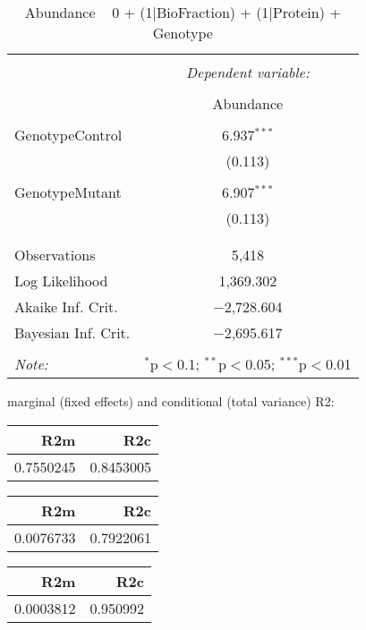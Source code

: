 \documentclass[11pt]{report}
\begin{document}
\begin{table}[!htbp] \centering 
  \caption{Abundance ~ 0 + (1|BioFraction) + (1|Protein) + Genotype} 
  \label{} 
\begin{tabular}{@{\extracolsep{5pt}}lc} 
\\[-1.8ex]\hline 
\hline \\[-1.8ex] 
 & \multicolumn{1}{c}{\textit{Dependent variable:}} \\ 
\cline{2-2} 
\\[-1.8ex] & Abundance \\ 
\hline \\[-1.8ex] 
 GenotypeControl & 6.937$^{***}$ \\ 
  & (0.113) \\ 
  & \\ 
 GenotypeMutant & 6.907$^{***}$ \\ 
  & (0.113) \\ 
  & \\ 
\hline \\[-1.8ex] 
Observations & 5,418 \\ 
Log Likelihood & 1,369.302 \\ 
Akaike Inf. Crit. & $-$2,728.604 \\ 
Bayesian Inf. Crit. & $-$2,695.617 \\ 
\hline 
\hline \\[-1.8ex] 
\textit{Note:}  & \multicolumn{1}{r}{$^{*}$p$<$0.1; $^{**}$p$<$0.05; $^{***}$p$<$0.01} \\ 
\end{tabular} 
\end{table} 
marginal (fixed effects) and conditional (total variance) R2:

\begin{tabular}{r|r}
\hline
R2m & R2c\\
\hline
0.7550245 & 0.8453005\\
\hline
\end{tabular}

\begin{tabular}{r|r}
\hline
R2m & R2c\\
\hline
0.0076733 & 0.7922061\\
\hline
\end{tabular}

\begin{tabular}{r|r}
\hline
R2m & R2c\\
\hline
0.0003812 & 0.950992\\
\hline
\end{tabular}
\end{document}
